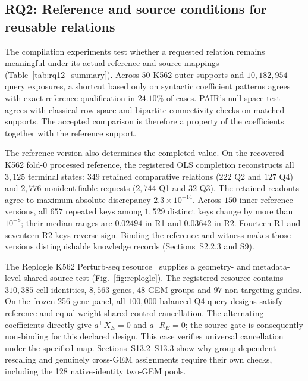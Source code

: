 \documentclass[preprint,12pt,number,sort&compress]{elsarticle}
\begin{document}
\subsection{RQ2: Reference and source conditions for reusable relations}\label{subsec:result-kg}

The compilation experiments test whether a requested relation remains meaningful under its actual reference and source mappings (Table~\ref{tab:rq12_summary}). Across $50$ K562 outer supports and $10{,}182{,}954$ query exposures, a shortcut based only on syntactic coefficient patterns agrees with exact reference qualification in $24.10\%$ of cases. PAIR's null-space test agrees with classical row-space and bipartite-connectivity checks on matched supports. The accepted comparison is therefore a property of the coefficients together with the reference support.



The reference version also determines the completed value. On the recovered K562 fold-0 processed reference, the registered OLS completion reconstructs all $3{,}125$ terminal states: $349$ retained comparative relations ($222$ Q2 and $127$ Q4) and $2{,}776$ nonidentifiable requests ($2{,}744$ Q1 and $32$ Q3). The retained readouts agree to maximum absolute discrepancy $2.3\times10^{-14}$. Across $150$ inner reference versions, all $657$ repeated keys among $1{,}529$ distinct keys change by more than $10^{-8}$; their median ranges are $0.02494$ in R1 and $0.03642$ in R2. Fourteen R1 and seventeen R2 keys reverse sign. Binding the reference and witness makes those versions distinguishable knowledge records (Sections~S2.2.3 and S9).

The Replogle K562 Perturb-seq resource~\cite{replogle2022perturbseq} supplies a geometry- and metadata-level shared-source test (Fig.~\ref{fig:replogle}). The registered resource contains $310{,}385$ cell identities, $8{,}563$ genes, $48$ GEM groups and $97$ non-targeting guides. On the frozen 256-gene panel, all $100{,}000$ balanced Q4 query designs satisfy reference and equal-weight shared-control cancellation. The alternating coefficients directly give $a^\top X_E=0$ and $a^\top R_E=0$; the source gate is consequently non-binding for this declared design. This case verifies universal cancellation under the specified map. Sections~S13.2--S13.3 show why group-dependent rescaling and genuinely cross-GEM assignments require their own checks, including the 128 native-identity two-GEM pools.
\end{document}
